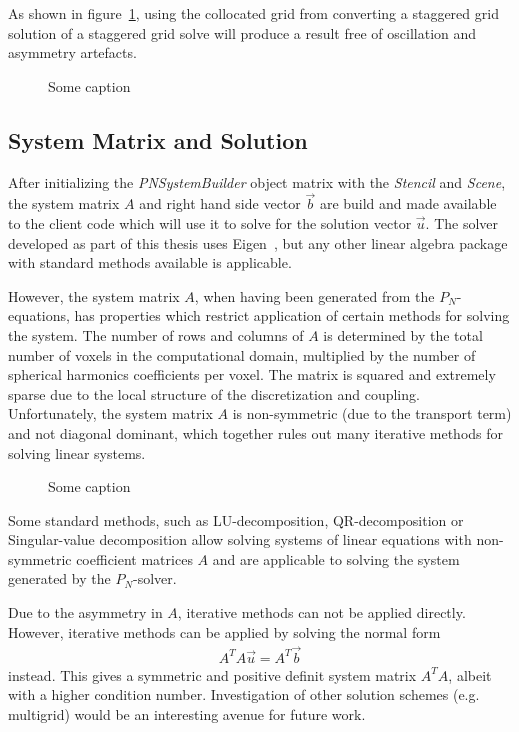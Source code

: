 As shown in figure~\ref{fig:pn_staggered_grid_noartefacts}, using the collocated grid from converting a staggered grid solution of a staggered grid solve will produce a result free of oscillation and asymmetry artefacts.
\begin{figure}[h]
\centering
{}
\caption{Some caption}
\label{fig:pn_staggered_grid_noartefacts}
\end{figure}

\subsection{System Matrix and Solution}
\label{sec:pn_system_matrix}

After initializing the \emph{PNSystemBuilder} object matrix with the \emph{Stencil} and \emph{Scene}, the system matrix $A$ and right hand side vector $\vec{b}$ are build and made available to the client code which will use it to solve for the solution vector $\vec{u}$. The solver developed as part of this thesis uses Eigen~\cite{Eigen}, but any other linear algebra package with standard methods available is applicable. 

However, the system matrix $A$, when having been generated from the $P_N$-equations, has properties which restrict application of certain methods for solving the system. The number of rows and columns of $A$ is determined by the total number of voxels in the computational domain, multiplied by the number of spherical harmonics coefficients per voxel. The matrix is squared and extremely sparse due to the local structure of the discretization and coupling. Unfortunately, the system matrix $A$ is non-symmetric (due to the transport term) and not diagonal dominant, which together rules out many iterative methods for solving linear systems.
\begin{figure}[h]
\centering
{}
\caption{Some caption}
\label{fig:pn_matrix_layout}
\end{figure}

Some standard methods, such as LU-decomposition, QR-decomposition or Singular-value decomposition allow solving systems of linear equations with non-symmetric coefficient matrices $A$ and are applicable to solving the system generated by the $P_N$-solver. 

Due to the asymmetry in $A$, iterative methods can not be applied directly. However, iterative methods can be applied by solving the normal form
\begin{align}
A^TA\vec{u} = A^T\vec{b}
\end{align}
instead. This gives a symmetric and positive definit system matrix $A^TA$, albeit with a higher condition number. Investigation of other solution schemes (e.g. multigrid) would be an interesting avenue for future work.

